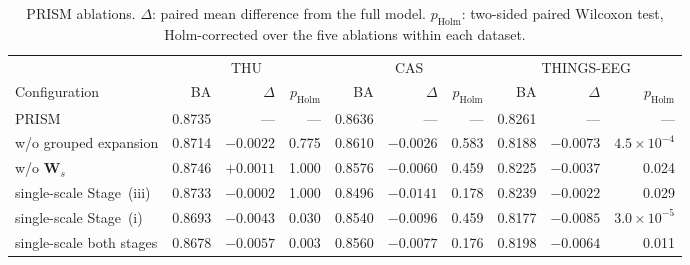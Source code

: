 \begin{table}[H]
\centering
\caption{PRISM ablations. $\Delta$: paired mean difference from the full model. $p_\mathrm{Holm}$: two-sided paired Wilcoxon test, Holm-corrected over the five ablations within each dataset.}
\label{tab:supp-ablation}
\scriptsize
\begin{adjustbox}{max width=\textwidth}
\begin{tabular}{@{}lrrrrrrrrr@{}}
\toprule
& \multicolumn{3}{c}{THU} & \multicolumn{3}{c}{CAS} & \multicolumn{3}{c}{THINGS-EEG} \\
\cmidrule(lr){2-4}\cmidrule(lr){5-7}\cmidrule(lr){8-10}
Configuration & BA & $\Delta$ & $p_\mathrm{Holm}$ & BA & $\Delta$ & $p_\mathrm{Holm}$ & BA & $\Delta$ & $p_\mathrm{Holm}$ \\
\midrule
PRISM & 0.8735 & --- & --- & 0.8636 & --- & --- & 0.8261 & --- & --- \\
\quad w/o grouped expansion & 0.8714 & $-0.0022$ & 0.775 & 0.8610 & $-0.0026$ & 0.583 & 0.8188 & $-0.0073$ & $4.5\times10^{-4}$ \\
\quad w/o $\mathbf{W}_s$ & 0.8746 & $+0.0011$ & 1.000 & 0.8576 & $-0.0060$ & 0.459 & 0.8225 & $-0.0037$ & 0.024 \\
\quad single-scale Stage~(iii) & 0.8733 & $-0.0002$ & 1.000 & 0.8496 & $-0.0141$ & 0.178 & 0.8239 & $-0.0022$ & 0.029 \\
\quad single-scale Stage~(i) & 0.8693 & $-0.0043$ & 0.030 & 0.8540 & $-0.0096$ & 0.459 & 0.8177 & $-0.0085$ & $3.0\times10^{-5}$ \\
\quad single-scale both stages & 0.8678 & $-0.0057$ & 0.003 & 0.8560 & $-0.0077$ & 0.176 & 0.8198 & $-0.0064$ & 0.011 \\
\bottomrule
\end{tabular}
\end{adjustbox}
\end{table}
